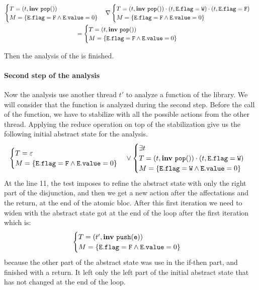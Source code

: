 \begin{scriptsize}
\begin{multline*}
\begin{cases}
	T = (t, \mathbf{inv}\ \mathtt{pop}())\\
	M = \{\mathtt{E.flag} = \mathtt{F} \wedge \mathtt{E.value} = 0\}
\end{cases}
\nabla
\begin{cases}
	T =  (t, \mathbf{inv}\ \mathtt{pop}())\cdot(t, \mathtt{E.flag=W})\cdot (t, \mathtt{E.flag=F})\\
	M = \{\mathtt{E.flag} = \mathtt{F} \wedge \mathtt{E.value} = 0\}
\end{cases} \\ =
\begin{cases}
	T = (t, \mathbf{inv}\ \mathtt{pop}())\\
	M = \{\mathtt{E.flag} = \mathtt{F} \wedge \mathtt{E.value} = 0\}
\end{cases}
\end{multline*} 
\end{scriptsize} Then the analysis of the  is finished. 

\paragraph{Second step of the analysis}

Now the analysis use another thread $t'$ to analyze a function of the library. We will consider that the function  is analyzed during the second step. Before the call of the  function, we have to stabilize with all the possible actions from the other thread. Applying the reduce operation on top of the stabilization give us the following initial abstract state for the  analysis.
\[\begin{cases}
	T = \varepsilon\\
	M = \{\mathtt{E.flag} = \mathtt{F} \wedge \mathtt{E.value} = 0\}
\end{cases} \vee
\begin{cases}
	\exists t \\
	T = (t, \mathbf{inv}\ \mathtt{pop}()) \cdot (t, \mathtt{E.flag} = \mathtt{W})\\
	M = \{\mathtt{E.flag} = \mathtt{W} \wedge \mathtt{E.value} = 0\}
\end{cases}
\]
At the line 11, the test imposes to refine the abstract state with only the right part of the disjunction, and then we get a new action after the affectations and the return, at the end of the atomic bloc. 
After this first iteration we need to widen with the abstract state got at the end of the loop after the first iteration which is: 
\[\begin{cases}
	T = (t', \mathbf{inv}\ \mathtt{push}(\mathtt{e}))\\
	M = \{\mathtt{E.flag} = \mathtt{F} \wedge \mathtt{E.value} = 0\}
\end{cases}
\]
because the other part of the abstract state was use in the if-then part, and finished with a return. It left only the left part of the initial abstract state that has not changed at the end of the loop.

